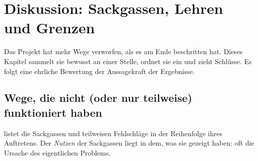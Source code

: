 \chapter{Diskussion: Sackgassen, Lehren und Grenzen}\label{ch:diskussion}

Das Projekt hat mehr Wege verworfen, als es am Ende beschritten hat. Dieses Kapitel sammelt sie bewusst an einer Stelle, ordnet sie ein und zieht Schlüsse. Es folgt eine ehrliche Bewertung der Aussagekraft der Ergebnisse.

\section{Wege, die nicht (oder nur teilweise) funktioniert haben}
 listet die Sackgassen und teilweisen Fehlschläge in der Reihenfolge ihres Auftretens. Der \emph{Nutzen} der Sackgassen liegt in dem, was sie gezeigt haben: oft die Ursache des eigentlichen Problems.

